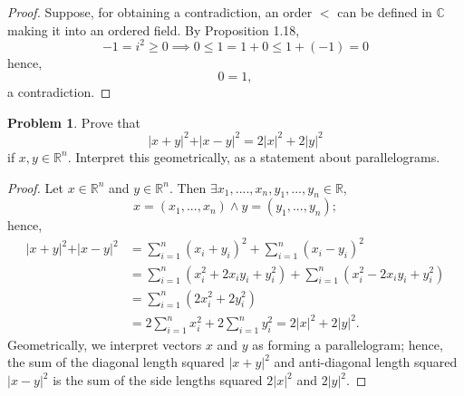 \documentclass{amsart}
\theoremstyle{definition}
\newtheorem{problem}{Problem}
\begin{document}
\begin{proof}
    Suppose, for obtaining a contradiction, an order $<$ can be defined in $\mathbb{C}$ making it into an ordered field. By Proposition 1.18, 
    \[
    -1 = i^2 \geq 0 \implies 0 \leq 1 = 1 + 0 \leq 1 + (-1) = 0
    \]
    hence,
    \[
    0 = 1,
    \]
    a contradiction.
\end{proof}

\begin{problem}
    Prove that 
    \[
    \vert x+y \vert^2 + \vert x-y \vert^2 = 2\vert x \vert^2 + 2\vert y \vert^2
    \]
    if $x,y \in \mathbb{R}^n$. Interpret this geometrically, as a statement about parallelograms.
\end{problem}

\begin{proof}
    Let $x \in \mathbb{R}^n$ and $y \in \mathbb{R}^n$. Then $\exists x_1,....,x_n,y_1,...,y_n \in \mathbb{R}$,
    \[
    x = (x_1,...,x_n) \land y = (y_1,...,y_n); 
    \]
    hence,
    \begin{align*}
        \vert x+y \vert^2 + \vert x-y \vert^2 &= \sum_{i = 1}^{n}(x_i+y_i)^2 + \sum_{i = 1}^{n}(x_i-y_i)^2 \\
        &= \sum_{i = 1}^{n}(x_i^2 + 2x_iy_i + y_i^2) + \sum_{i = 1}^{n}(x_i^2 - 2x_iy_i + y_i^2) \\
        &= \sum_{i = 1}^{n}(2x_i^2 + 2y_i^2) \\
        &= 2\sum_{i = 1}^{n}x_i^2 + 2\sum_{i = 1}^{n}y_i^2 = 2\vert x \vert^2 + 2\vert y \vert^2.
    \end{align*}
    Geometrically, we interpret vectors $x$ and $y$ as forming a parallelogram; hence, the sum of the diagonal length squared $\vert x+y \vert^2$ and anti-diagonal length squared $\vert x-y \vert^2$ is the sum of the side lengths squared $2\vert x \vert^2$ and $2\vert y \vert^2$. 
\end{proof}
\end{document}
